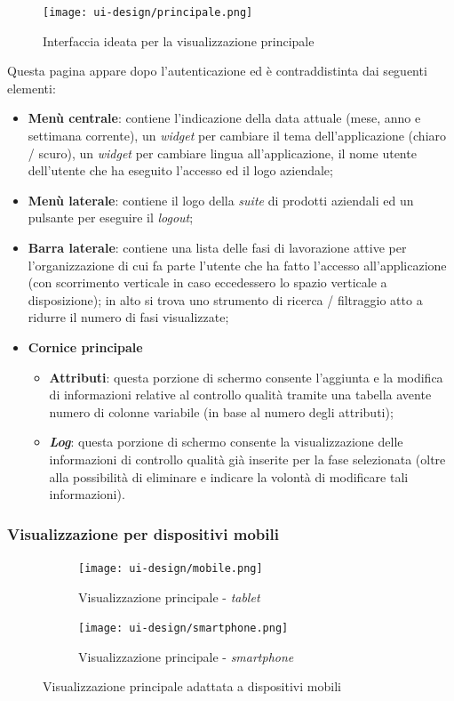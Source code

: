 \begin{figure}[H]
    \centering
    \texttt{[image: ui-design/principale.png]}
    \caption{Interfaccia ideata per la visualizzazione principale}
\end{figure}
Questa pagina appare dopo l'autenticazione ed è contraddistinta dai seguenti elementi:
\begin{itemize}
    \item \textbf{Menù centrale}: contiene l’indicazione della data attuale (mese, anno e settimana corrente), un \textit{widget} per cambiare il tema dell’applicazione (chiaro / scuro), un \textit{widget} per cambiare lingua all’applicazione, il nome utente dell’utente che ha eseguito l’accesso ed il logo aziendale;
    \item \textbf{Menù laterale}: contiene il logo della \textit{suite} di prodotti aziendali ed un pulsante per eseguire il \textit{logout};
    \item \textbf{Barra laterale}: contiene una lista delle fasi di lavorazione attive per l’organizzazione di cui fa parte l’utente che ha fatto l’accesso all’applicazione (con scorrimento verticale in caso eccedessero lo spazio verticale a disposizione);
                                in alto si trova uno strumento di ricerca / filtraggio atto a ridurre il numero di fasi visualizzate;
    \item \textbf{Cornice principale}
        \begin{itemize}
            \item \textbf{Attributi}: questa porzione di schermo consente l’aggiunta e la modifica di informazioni relative al controllo qualità tramite una tabella avente numero di colonne variabile (in base al numero degli attributi);
            \item \textbf{\textit{Log}}: questa porzione di schermo consente la visualizzazione delle informazioni di controllo qualità già inserite per la fase selezionata (oltre alla possibilità di eliminare e indicare la volontà di modificare tali informazioni).
        \end{itemize}
\end{itemize}

\subsubsection*{Visualizzazione per dispositivi mobili}
\label{subsubsec:mobile}
  \begin{figure}[H]
	\centering
	\begin{subfigure}[t]{.5\textwidth}
	  \centering
	  \texttt{[image: ui-design/mobile.png]}
	  \caption{Visualizzazione principale - \textit{tablet}}
	\end{subfigure}%
	\begin{subfigure}[t]{.5\textwidth}
	  \centering
	  \texttt{[image: ui-design/smartphone.png]}
	  \caption{Visualizzazione principale - \textit{smartphone}}
	\end{subfigure}
	\caption{Visualizzazione principale adattata a dispositivi mobili}
\end{figure}

